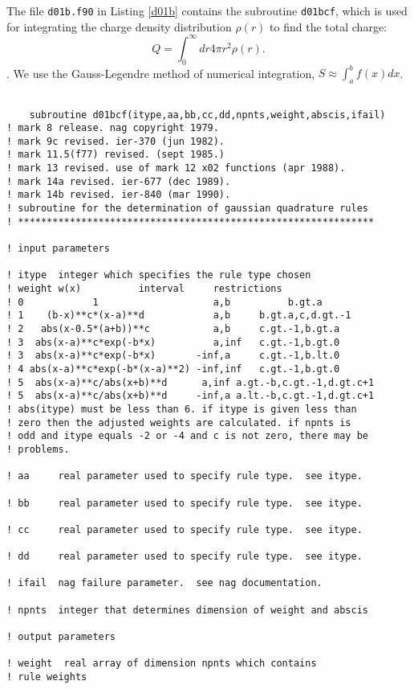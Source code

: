 \documentclass[12pt]{article}
\begin{document}
The file {\tt d01b.f90} in Listing \ref{d01b} contains the subroutine {\tt d01bcf}, which is used for integrating the charge density distribution $\rho(r)$ to find the total charge: \[Q=\int_0^\infty dr 4\pi r^2\rho(r).\]. We use the Gauss-Legendre method of numerical integration, $S\approx\int_a^bf(x)dx$.

\begin{lstlisting}[frame=single,caption={{\tt d01b.f90}},label=d01b]

    subroutine d01bcf(itype,aa,bb,cc,dd,npnts,weight,abscis,ifail)
! mark 8 release. nag copyright 1979.
! mark 9c revised. ier-370 (jun 1982).
! mark 11.5(f77) revised. (sept 1985.)
! mark 13 revised. use of mark 12 x02 functions (apr 1988).
! mark 14a revised. ier-677 (dec 1989).
! mark 14b revised. ier-840 (mar 1990).
! subroutine for the determination of gaussian quadrature rules
! **************************************************************

! input parameters

! itype  integer which specifies the rule type chosen
! weight w(x)          interval     restrictions
! 0            1                    a,b          b.gt.a
! 1    (b-x)**c*(x-a)**d            a,b     b.gt.a,c,d.gt.-1
! 2   abs(x-0.5*(a+b))**c           a,b     c.gt.-1,b.gt.a
! 3  abs(x-a)**c*exp(-b*x)          a,inf   c.gt.-1,b.gt.0
! 3  abs(x-a)**c*exp(-b*x)       -inf,a     c.gt.-1,b.lt.0
! 4 abs(x-a)**c*exp(-b*(x-a)**2) -inf,inf   c.gt.-1,b.gt.0
! 5  abs(x-a)**c/abs(x+b)**d      a,inf a.gt.-b,c.gt.-1,d.gt.c+1
! 5  abs(x-a)**c/abs(x+b)**d     -inf,a a.lt.-b,c.gt.-1,d.gt.c+1
! abs(itype) must be less than 6. if itype is given less than
! zero then the adjusted weights are calculated. if npnts is
! odd and itype equals -2 or -4 and c is not zero, there may be
! problems.

! aa     real parameter used to specify rule type.  see itype.

! bb     real parameter used to specify rule type.  see itype.

! cc     real parameter used to specify rule type.  see itype.

! dd     real parameter used to specify rule type.  see itype.

! ifail  nag failure parameter.  see nag documentation.

! npnts  integer that determines dimension of weight and abscis

! output parameters

! weight  real array of dimension npnts which contains
! rule weights


\end{lstlisting}
\end{document}

